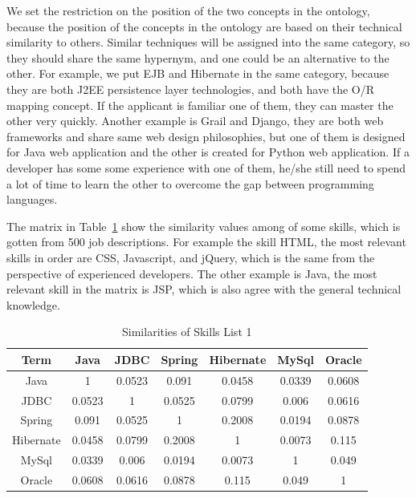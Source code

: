 We set the restriction on the position of the two concepts in the ontology, because the position of the concepts in the ontology are based on their technical similarity to others. Similar techniques will be assigned into the same category, so they should share the same hypernym, and one could be an alternative to the other. For example, we put EJB and Hibernate in the same category, because they are both J2EE persistence layer technologies, and both have the O/R mapping concept. If the applicant is familiar one of them, they can master the other very quickly. Another example is Grail and Django, they are both web frameworks and share same web design philosophies, but one of them is designed for Java web application and the other is created for Python web application. If a developer has some some experience with one of them, he/she still need to spend a lot of time to learn the other to overcome the gap between programming languages. 

The matrix in Table~\ref{tab:dismatrix1} show the similarity values among of some skills, which is gotten from 500 job descriptions. For example the skill HTML, the most relevant skills in order are CSS, Javascript, and jQuery,  which is the same from the perspective of experienced developers. The other example is Java, the most relevant skill in the matrix is JSP, which is also agree with the general technical knowledge.


\begin{table}

\caption{Similarities of Skills List 1}
\begin{tabular}{ c | c c c c c c   }
 \hline
  Term       &  Java  &  JDBC  & Spring & Hibernate & MySql  & Oracle   \\  \hline
  Java   &   1    & 0.0523 & 0.091  &   0.0458  & 0.0339 & 0.0608    \\  \hline
    JDBC   & 0.0523 &   1    & 0.0525 &   0.0799  & 0.006  & 0.0616   \\  \hline
   Spring  & 0.091  & 0.0525 &   1    &   0.2008  & 0.0194 & 0.0878   \\  \hline
 Hibernate & 0.0458 & 0.0799 & 0.2008 &     1     & 0.0073 & 0.115    \\  \hline
   MySql   & 0.0339 & 0.006  & 0.0194 &   0.0073  &   1    & 0.049    \\  \hline
   Oracle  & 0.0608 & 0.0616 & 0.0878 &   0.115   & 0.049  &   1      \\  \hline
 \hline
\end{tabular}
\label{tab:dismatrix1}
\end{table}


